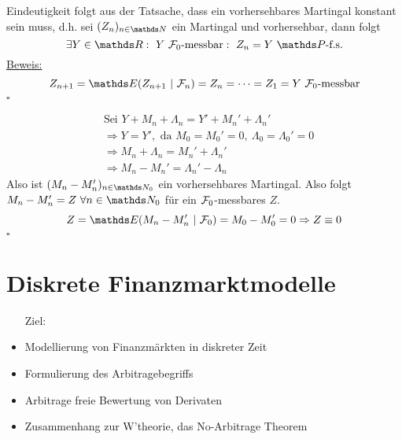 Eindeutigkeit folgt aus der Tatsache, dass ein vorhersehbares Martingal konstant sein muss, d.h. sei $(Z_n)_{n\in\N}$ ein Martingal und vorhersehbar, dann folgt 
\[
\exists Y\in\R:~Y~ \F_0\text{-messbar}:~Z_n=Y~\Pw\text{-f.s.}
\]
\uline{Beweis:} 
\[
Z_{n+1}=\E(Z_{n+1}~|~\F_n)=Z_n=\dots=Z_1=Y ~ \F_0\text{-messbar} 
\] 
\hfill $\square$

\begin{equation*}
\begin{aligned}
	&\text{Sei } Y+M_n+\Lambda_n=Y'+M_n'+\Lambda_n'\\
	&\Rightarrow Y=Y', \text{ da } M_0=M_0'=0,~ \Lambda_0=\Lambda_0'=0\\
	&\Rightarrow M_n+\Lambda_n=M_n'+\Lambda_n'\\
	&\Rightarrow M_n-M_n'=\Lambda_n'-\Lambda_n
\end{aligned}
\end{equation*}
Also ist $(M_n-M_n')_{n\in \N_0}$ ein vorhersehbares Martingal. Also folgt $M_n-M_n'=Z~\forall n\in \N_0$ für ein $\mathcal{F}_0$-messbares $Z$.
\[
Z=\E(M_n-M_n'~|~\F_0)=M_0-M_0'=0 \Rightarrow Z\equiv 0 
\]
\hfill $\square$


\section{Diskrete Finanzmarktmodelle}
\label{sec:disk_finanzmarktmodelle}
\begin{itemize}
	\item[Ziel:]
	\item Modellierung von Finanzmärkten in diskreter Zeit
	\item Formulierung des Arbitragebegriffs
	\item Arbitrage freie Bewertung von Derivaten
	\item Zusammenhang zur W'theorie, das No-Arbitrage Theorem
\end{itemize}

